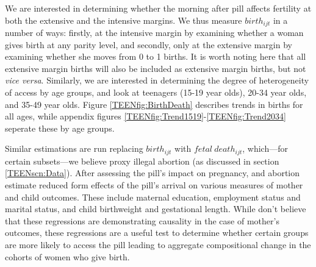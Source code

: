 We are interested in determining whether the morning after pill affects 
fertility at both the extensive and the intensive margins.  We thus measure
$birth_{ijt}$ in a number of ways: firstly, at the intensive margin by 
examining whether a woman gives birth at any parity level, and secondly, only 
at the extensive margin by examining whether she moves from 0 to 1 births. 
It is worth noting here that all extensive margin births will also be 
included as extensive margin births, but not \emph{vice versa}.  Similarly, 
we are interested in determining the degree of heterogeneity of access by age 
groups, and look at teenagers (15-19 year olds), 20-34 year olds, and 35-49 
year olds. Figure \ref{TEENfig:BirthDeath} describes trends in births for all 
ages, while appendix figures \ref{TEENfig:Trend1519}-\ref{TEENfig:Trend2034} 
seperate these by age groups.

Similar estimations are run replacing $birth_{ijt}$ with $fetal\ death_{ijt}$,
which---for certain subsets---we believe proxy illegal abortion (as discussed
in section \ref{TEENscn:Data}).  After assessing the pill's impact on pregnancy, 
and abortion \person estimate reduced form effects of the pill's arrival on 
various measures of mother and child outcomes.  These include maternal education,
employment status and marital status, and child birthweight and gestational
length.  While \person don't believe that these regressions are demonstrating
causality in the case of mother's outcomes, these regressions are a useful test
to determine whether certain groups are more likely to access the pill leading to
aggregate compositional change in the cohorts of women who give birth.

